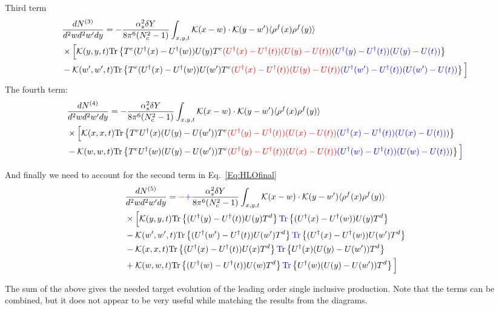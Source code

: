 \documentclass[aps,prd,amsmath,amssymb,nofootinbib]{revtex4-2}
\numberwithin{equation}{section}
\begin{document}
Third term 
\begin{align}
    &\frac{dN^{(3)}}{d^2 w d^2 w' d y} = - \frac{\alpha_s^2 \delta Y}{8 \pi^6 (N_c^2-1)}
\int_{x,y,t} {\cal K}(x-w)\cdot {\cal K}(y-w') \langle\rho^f(x) \rho^f(y) \rangle \notag \\ & \times  
\Big[ 
 {\cal K}(y,y,t) {\rm Tr} \left\{ T^e (U^\dagger(x) - U^\dagger(w)) U(y) T^e \textcolor{red}{( U^\dagger(x) - U^\dagger(t) )  ( U(y) - U(t) )}\textcolor{blue}{( U^\dagger(y) - U^\dagger(t) )  ( U(y) - U(t) )}\right\}
 \notag \\ & -  {\cal K}(w', w',t) {\rm Tr} \left\{ T^e (U^\dagger(x) - U^\dagger(w)) U(w') T^e \textcolor{red}{( U^\dagger(x) - U^\dagger(t) )  ( U(y) - U(t) )}\textcolor{blue}{( U^\dagger(w') - U^\dagger(t) )  ( U(w') - U(t) )}\right\}
\Big] 
\end{align} 
The fourth term:
\begin{align}
    &\frac{dN^{(4)}}{d^2 w d^2 w' d y} = - \frac{\alpha_s^2 \delta Y}{8 \pi^6 (N_c^2-1)}
\int_{x,y,t} {\cal K}(x-w)\cdot {\cal K}(y-w') \langle\rho^f(x) \rho^f(y) \rangle \notag \\ & \times  
\Big[ 
 {\cal K}(x,x,t) {\rm Tr} \left\{ T^e U^\dagger(x) ( U(y) - U(w') ) T^e \textcolor{red}{( U^\dagger(y) - U^\dagger(t) )  ( U(x) - U(t) )}\textcolor{blue}{( U^\dagger(x) - U^\dagger(t) )  ( U(x) - U(t) )} )\right\}
 \notag \\ & -  {\cal K}(w, w,t) {\rm Tr} \left\{ T^e U^\dagger(w) ( U(y) - U(w') )  T^e \textcolor{red}{( U^\dagger(y) - U^\dagger(t) )  ( U(x) - U(t) )}\textcolor{blue}{( U^\dagger(w) - U^\dagger(t) )  ( U(w) - U(t) )} )\right\}
\Big] 
\end{align} 


And finally we need to account for the second term in Eq.~\eqref{Eq:HLOfinal} 
\begin{align}
    &\frac{dN^{(5)}}{d^2 w d^2 w' d y} =  \textcolor{red}{-}\textcolor{blue}{+}\frac{\alpha_s^2 \delta Y}{8 \pi^6 (N_c^2-1)}
\int_{x,y,t} {\cal K}(x-w)\cdot {\cal K}(y-w') \langle\rho^f(x) \rho^f(y) \rangle \notag \\ & \times  
\Big[ 
 {\cal K}(y,y,t) {\rm Tr} \left\{ (U^\dagger(y) -U^\dagger(t) ) U(y) T^d \right\} \textcolor{blue}{{\rm Tr}}\left\{ (U^\dagger(x) -U^\dagger(w) ) U(y) T^d \right\} \notag \\ &
 -  {\cal K}(w',w',t) {\rm Tr} \left\{ (U^\dagger(w') -U^\dagger(t) ) U(w') T^d \right\} \textcolor{blue}{{\rm Tr}}\left\{ (U^\dagger(x) -U^\dagger(w) ) U(w') T^d \right\}
\notag \\ &
 -  {\cal K}(x,x,t) {\rm Tr} \left\{ (U^\dagger(x) -U^\dagger(t) ) U(x) T^d \right\} 
 \textcolor{blue}{{\rm Tr}}\left\{ U^\dagger(x)  (U(y) - U(w')) T^d \right\}
\notag \\ & 
+ {\cal K}(w,w,t) {\rm Tr} \left\{ (U^\dagger(w) -U^\dagger(t) ) U(w) T^d \right\} 
 \textcolor{blue}{{\rm Tr}}\left\{ U^\dagger(w)  (U(y) - U(w')) T^d \right\}
\Big] 
\end{align} 


The sum of the above gives the needed target evolution of the leading order single inclusive production. 
Note that the terms can be combined, but it does not appear to be very useful while matching the results from the diagrams.
\end{document}
